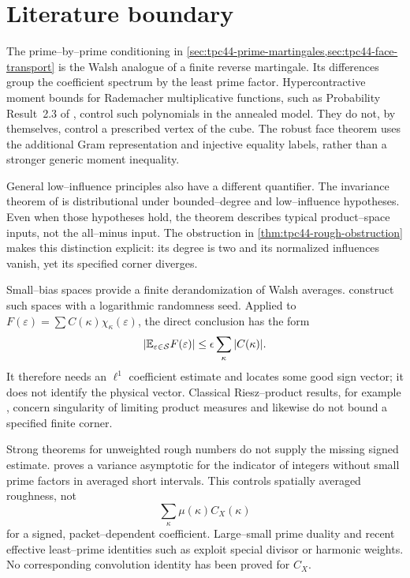 \section{Literature boundary}
\label{sec:tpc44-literature}

The prime--by--prime conditioning in
\cref{sec:tpc44-prime-martingales,sec:tpc44-face-transport} is the Walsh
analogue of a finite reverse martingale.  Its differences group the
coefficient spectrum by the least prime factor.  Hypercontractive moment
bounds for Rademacher multiplicative functions, such as Probability
Result~2.3 of \citet{Harper2019HighMoments}, control such polynomials in
the annealed model.  They do not, by themselves, control a prescribed
vertex of the cube.  The robust face theorem uses the additional Gram
representation and injective equality labels, rather than a stronger
generic moment inequality.

General low--influence principles also have a different quantifier.
The invariance theorem of
\citet[Theorem~3.18]{MosselODonnellOleszkiewicz2010} is distributional
under bounded--degree and low--influence hypotheses.  Even when those
hypotheses hold, the theorem describes typical product--space inputs,
not the all--minus input.  The obstruction in
\cref{thm:tpc44-rough-obstruction} makes this distinction explicit: its
degree is two and its normalized influences vanish, yet its specified
corner diverges.

Small--bias spaces provide a finite derandomization of Walsh averages.
\citet[Theorem~3.2]{NaorNaor1993} construct such spaces with a logarithmic
randomness seed.  Applied to
\(
 F(\varepsilon)=\sum C(\kappa)\chi_\kappa(\varepsilon)
\), the direct conclusion has the form
\begin{equation}
 |\mathbb E_{\varepsilon\in\mathcal S}F(\varepsilon)|
 \le\epsilon\sum_\kappa|C(\kappa)|.
 \label{eq:tpc44-small-bias-l1}
\end{equation}
It therefore needs an \(\ell^1\) coefficient estimate and locates some
good sign vector; it does not identify the physical vector.  Classical
Riesz--product results, for example \citet[Theorem~1.2]{Peyriere1975},
concern singularity of limiting product measures and likewise do not
bound a specified finite corner.

Strong theorems for unweighted rough numbers do not supply the missing
signed estimate.  \citet[Theorem~1.1]{GorodetskyRoughVariance} proves a
variance asymptotic for the indicator of integers without small prime
factors in averaged short intervals.  This controls spatially averaged
roughness, not
\begin{equation}
 \sum_{\kappa}\mu(\kappa)C_X(\kappa)
 \label{eq:tpc44-weighted-mobius-sum}
\end{equation}
for a signed, packet--dependent coefficient.  Large--small prime
duality \citep{Alladi1977} and recent effective least--prime identities
such as \citet[Theorem~1.1]{Tenenbaum2026} exploit special divisor or
harmonic weights.  No corresponding convolution identity has been
proved for \(C_X\).


